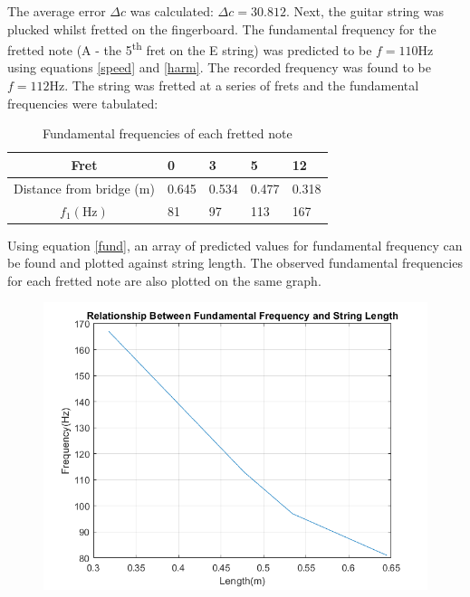 \documentclass[11pt]{article}
\begin{document}
            The average error $\Delta c$ was calculated: $\Delta c = 30.812$.
            \newpage
            Next, the guitar string was plucked whilst fretted on the fingerboard.
            The fundamental frequency for the fretted note (A - the 5\textsuperscript{th} fret on the E string) was predicted to be $f=110\si{\hertz}$ using equations \ref{speed} and \ref{harm}.
            The recorded frequency was found to be $f=112\si{\hertz}$.
            The string was fretted at a series of frets and the fundamental frequencies were tabulated:
            \begin{table}[H]
                \centering
                \begin{tabular}{c | l l l l}
                    \hline
                    Fret & 0 & 3 & 5 & 12 \\
                    \hline
                    Distance from bridge (\si{\meter}) & 0.645 & 0.534 & 0.477 & 0.318 \\
                    \hline
                    $f_1(\si{\hertz})$ & 81 & 97 & 113 & 167 \\
                    \hline
                \end{tabular}
                \caption{Fundamental frequencies of each fretted note}
            \end{table}
            Using equation \ref{fund}, an array of predicted values for fundamental frequency can be found and plotted against string length.
            The observed fundamental frequencies for each fretted note are also plotted on the same graph.
            \begin{figure}[H]
                \centering
                \includegraphics[scale=0.5]{resources/F1vsL.png}
            \end{figure}
\end{document}
